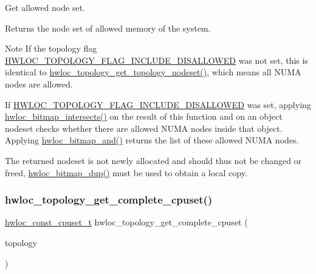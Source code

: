 Get allowed node set. 

\begin{DoxyReturn}{Returns}
the node set of allowed memory of the system.
\end{DoxyReturn}
\begin{DoxyNote}{Note}
If the topology flag \hyperlink{a00193_ggada025d3ec20b4b420f8038d23d6e7bdea10907044bbb306fd0dc76acf046d9258}{H\+W\+L\+O\+C\+\_\+\+T\+O\+P\+O\+L\+O\+G\+Y\+\_\+\+F\+L\+A\+G\+\_\+\+I\+N\+C\+L\+U\+D\+E\+\_\+\+D\+I\+S\+A\+L\+L\+O\+W\+ED} was not set, this is identical to \hyperlink{a00202_ga3fd37303e99ace8b0d0ea03f95f8c514}{hwloc\+\_\+topology\+\_\+get\+\_\+topology\+\_\+nodeset()}, which means all N\+U\+MA nodes are allowed.

If \hyperlink{a00193_ggada025d3ec20b4b420f8038d23d6e7bdea10907044bbb306fd0dc76acf046d9258}{H\+W\+L\+O\+C\+\_\+\+T\+O\+P\+O\+L\+O\+G\+Y\+\_\+\+F\+L\+A\+G\+\_\+\+I\+N\+C\+L\+U\+D\+E\+\_\+\+D\+I\+S\+A\+L\+L\+O\+W\+ED} was set, applying \hyperlink{a00205_gaefa070f9232857ba5a57297ea9a08ea2}{hwloc\+\_\+bitmap\+\_\+intersects()} on the result of this function and on an object nodeset checks whether there are allowed N\+U\+MA nodes inside that object. Applying \hyperlink{a00205_ga674533016ffed922a28b4f0b49b82cd4}{hwloc\+\_\+bitmap\+\_\+and()} returns the list of these allowed N\+U\+MA nodes.

The returned nodeset is not newly allocated and should thus not be changed or freed, \hyperlink{a00205_gae679434c1a5f41d3560a8a7e2c1b0dee}{hwloc\+\_\+bitmap\+\_\+dup()} must be used to obtain a local copy. 
\end{DoxyNote}
\mbox{\label{a00202_gaee30e03391c1ed7dfd617fb5c7bbb033}} 
\subsubsection{\texorpdfstring{hwloc\+\_\+topology\+\_\+get\+\_\+complete\+\_\+cpuset()}{hwloc\_topology\_get\_complete\_cpuset()}}
{\footnotesize\ttfamily \hyperlink{a00183_ga1f784433e9b606261f62d1134f6a3b25}{hwloc\+\_\+const\+\_\+cpuset\+\_\+t} hwloc\+\_\+topology\+\_\+get\+\_\+complete\+\_\+cpuset (\begin{DoxyParamCaption}\item[{\hyperlink{a00186_ga9d1e76ee15a7dee158b786c30b6a6e38}{hwloc\+\_\+topology\+\_\+t}}]{topology }\end{DoxyParamCaption})}




